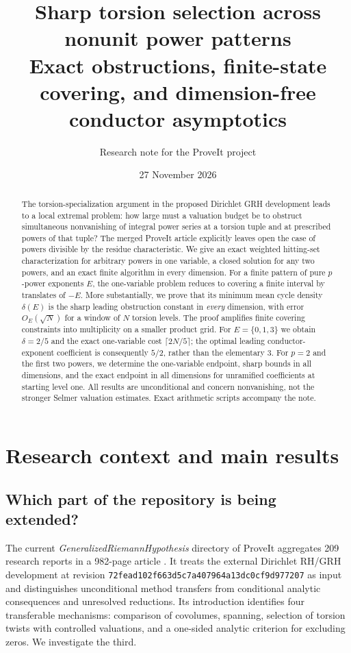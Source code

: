 \documentclass[11pt]{article}
\title{\textbf{Sharp torsion selection across nonunit power patterns}\\[5pt]\large Exact obstructions, finite-state covering, and dimension-free conductor asymptotics}
\author{Research note for the ProveIt project}
\date{27 November 2026}
\theoremstyle{definition}
\begin{document}
\maketitle
\begin{abstract}
The torsion-specialization argument in the proposed Dirichlet GRH development leads to a local extremal problem: how large must a valuation budget be to obstruct simultaneous nonvanishing of integral power series at a torsion tuple and at prescribed powers of that tuple? The merged ProveIt article explicitly leaves open the case of powers divisible by the residue characteristic. We give an exact weighted hitting-set characterization for arbitrary powers in one variable, a closed solution for any two powers, and an exact finite algorithm in every dimension. For a finite pattern of pure $p$-power exponents $E$, the one-variable problem reduces to covering a finite interval by translates of $-E$. More substantially, we prove that its minimum mean cycle density $\delta(E)$ is the sharp leading obstruction constant in \emph{every} dimension, with error $O_E(\sqrt N)$ for a window of $N$ torsion levels. The proof amplifies finite covering constraints into multiplicity on a smaller product grid. For $E=\{0,1,3\}$ we obtain $\delta=2/5$ and the exact one-variable cost $\lceil 2N/5\rceil$; the optimal leading conductor-exponent coefficient is consequently $5/2$, rather than the elementary $3$. For $p=2$ and the first two powers, we determine the one-variable endpoint, sharp bounds in all dimensions, and the exact endpoint in all dimensions for unramified coefficients at starting level one. All results are unconditional and concern nonvanishing, not the stronger Selmer valuation estimates. Exact arithmetic scripts accompany the note.
\end{abstract}
\tableofcontents

\section{Research context and main results}

\subsection{Which part of the repository is being extended?}

The current \emph{GeneralizedRiemannHypothesis} directory of ProveIt aggregates 209 research reports in a 982-page article \cite{project,article}. It treats the external Dirichlet RH/GRH development at revision \texttt{72fead102f663d5c7a407964a13dc0cf9d977207} as input and distinguishes unconditional method transfers from conditional analytic consequences and unresolved reductions. Its introduction identifies four transferable mechanisms: comparison of covolumes, spanning, selection of torsion twists with controlled valuations, and a one-sided analytic criterion for excluding zeros. We investigate the third.
\end{document}

